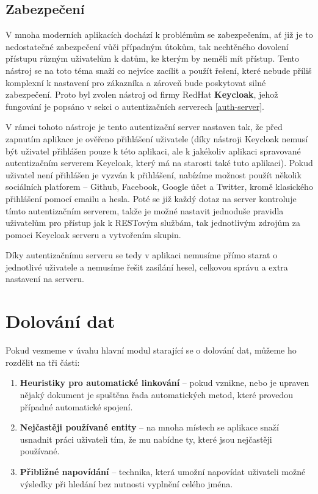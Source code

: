 \subsection{Zabezpečení}
\par V mnoha moderních aplikacích dochází k problémům se zabezpečením, ať již je to nedostatečné zabezpečení vůči případným útokům, tak nechtěného dovolení přístupu různým uživatelům k datům, ke kterým by neměli mít přístup. Tento nástroj se na toto téma snaží co nejvíce zacílit a použít řešení, které nebude příliš komplexní k nastavení pro zákazníka a zároveň bude poskytovat silné zabezpečení. Proto byl zvolen nástroj od firmy RedHat \textbf{Keycloak}, jehož fungování je popsáno v sekci o autentizačních serverech \ref{auth-server}.

\par V rámci tohoto nástroje je tento autentizační server nastaven tak, že před zapnutím aplikace je ověřeno přihlášení uživatele (díky nástroji Keycloak nemusí být uživatel přihlášen pouze k této aplikaci, ale k jakékoliv aplikaci spravované autentizačním serverem Keycloak, který má na starosti také tuto aplikaci). Pokud uživatel není přihlášen je vyzván k přihlášení, nabízíme možnost použít několik sociálních platforem -- Github, Facebook, Google účet a Twitter, kromě klasického přihlášení pomocí emailu a hesla. Poté se již každý dotaz na server kontroluje tímto autentizačním serverem, takže je možné nastavit jednoduše pravidla uživatelům pro přístup jak k RESTovým službám, tak jednotlivým zdrojům za pomoci Keycloak serveru a vytvořením skupin.

\par Díky autentizačnímu serveru se tedy v aplikaci nemusíme přímo starat o jednotlivé uživatele a nemusíme řešit zasílání hesel, celkovou správu a extra nastavení na serveru.

\section{Dolování dat}
\par Pokud vezmeme v úvahu hlavní modul starající se o dolování dat, můžeme ho rozdělit na tři části:
\begin{enumerate}
  \item \textbf{Heuristiky pro automatické linkování} -- pokud vznikne, nebo je upraven nějaký dokument je spuštěna řada automatických metod, které provedou případné automatické spojení.
  \item \textbf{Nejčastěji používané entity} -- na mnoha místech se aplikace snaží usnadnit práci uživateli tím, že mu nabídne ty, které jsou nejčastěji používané.
  \item \textbf{Přibližné napovídání} -- technika, která umožní napovídat uživateli možné výsledky při hledání bez nutnosti vyplnění celého jména.
\end{enumerate}

